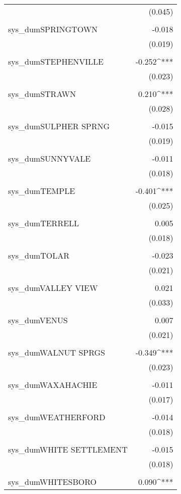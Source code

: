 \begin{table}[!htbp]
\begin{tabular}{@{\extracolsep{5pt}}lD{.}{.}{-3} }
  & (0.045) \\ 
  & \\ 
 sys\_dumSPRINGTOWN & -0.018 \\ 
  & (0.019) \\ 
  & \\ 
 sys\_dumSTEPHENVILLE & -0.252^{***} \\ 
  & (0.023) \\ 
  & \\ 
 sys\_dumSTRAWN & 0.210^{***} \\ 
  & (0.028) \\ 
  & \\ 
 sys\_dumSULPHER SPRNG & -0.015 \\ 
  & (0.019) \\ 
  & \\ 
 sys\_dumSUNNYVALE & -0.011 \\ 
  & (0.018) \\ 
  & \\ 
 sys\_dumTEMPLE & -0.401^{***} \\ 
  & (0.025) \\ 
  & \\ 
 sys\_dumTERRELL & 0.005 \\ 
  & (0.018) \\ 
  & \\ 
 sys\_dumTOLAR & -0.023 \\ 
  & (0.021) \\ 
  & \\ 
 sys\_dumVALLEY VIEW & 0.021 \\ 
  & (0.033) \\ 
  & \\ 
 sys\_dumVENUS & 0.007 \\ 
  & (0.021) \\ 
  & \\ 
 sys\_dumWALNUT SPRGS & -0.349^{***} \\ 
  & (0.023) \\ 
  & \\ 
 sys\_dumWAXAHACHIE & -0.011 \\ 
  & (0.017) \\ 
  & \\ 
 sys\_dumWEATHERFORD & -0.014 \\ 
  & (0.018) \\ 
  & \\ 
 sys\_dumWHITE SETTLEMENT & -0.015 \\ 
  & (0.018) \\ 
  & \\ 
 sys\_dumWHITESBORO & 0.090^{***} \\ 

\end{tabular}
\end{table}
